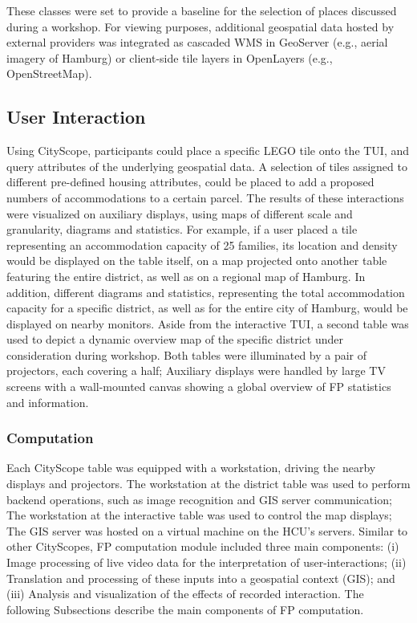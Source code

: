 {{{\begin{itemize}
            \end{itemize}
            These classes were set to provide a baseline for the selection of places discussed during a workshop. For viewing purposes, additional geospatial data hosted by external providers was integrated as cascaded WMS in GeoServer (e.g., aerial imagery of Hamburg) or client-side tile layers in OpenLayers (e.g., OpenStreetMap).
        }

        \subsection{User Interaction}
        {
            Using CityScope, participants could place a specific LEGO tile onto the TUI, and query attributes of the underlying geospatial data. A selection of tiles assigned to different pre-defined housing attributes, could be placed to add a proposed numbers of accommodations to a certain parcel. The results of these interactions were visualized on auxiliary displays, using maps of different scale and granularity, diagrams and statistics. For example, if a user placed a tile representing an accommodation capacity of 25 families, its location and density would be displayed on the table itself, on a map projected onto another table featuring the entire district, as well as on a regional map of Hamburg.
            \newline
            In addition, different diagrams and statistics, representing the total accommodation capacity for a specific district, as well as for the entire city of Hamburg, would be displayed on nearby monitors.
            Aside from the interactive TUI, a second table was used to depict a dynamic overview map of the specific district under consideration during workshop. Both tables were illuminated by a pair of projectors, each covering a half; Auxiliary displays were handled by large TV screens with a wall-mounted canvas showing a global overview of FP statistics and information.
        }

        \subsubsection{Computation}
        {
            Each CityScope table was equipped with a workstation, driving the nearby displays and projectors. The workstation at the district table was used to perform backend operations, such as image recognition and GIS server communication; The workstation at the interactive table was used to control the map displays; The GIS server was hosted on a virtual machine on the HCU's servers. Similar to other CityScopes, FP computation module included three main components: (i) Image processing of live video data for the interpretation of user-interactions; (ii) Translation and processing of these inputs into a geospatial context (GIS); and (iii) Analysis and visualization of the effects of recorded interaction. The following Subsections describe the main components of FP computation.
        }

}}
